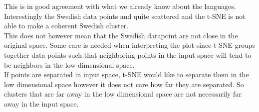 This is in good agreement with what we already know about the languages. Interestingly the Swedish data points and quite scattered and the t-SNE is not able to make a coherent Swedish cluster.\\

This does not however mean that the Swedish datapoint are not close in the original space. Some care is needed when interpreting the plot since t-SNE groups together data points such that neighboring points in the input space will tend to be neighbors in the low dimensional space.\\

If points are separated in input space, t-SNE would like to separate them in the low dimensional space however it does not care how far they are separated. So clusters that are far away in the low dimensional space are not necessarily far away in the input space.

%
%
%
